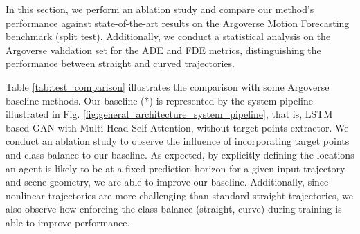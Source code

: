 In this section, we perform an ablation study and compare our method's performance against state-of-the-art results on the Argoverse Motion Forecasting benchmark (split test). Additionally, we conduct a statistical analysis on the Argoverse validation set for the ADE and FDE metrics, distinguishing the performance between straight and curved trajectories.

\begin{comment}
\begin{table}[!h]
	\caption{Ablation study of our unimodal pipeline, and comparison with other relevant methods on Argoverse 1 Motion Forecasting test set. We can see the improvement using Target points (TP) and Class balance (CB)}
	\begin{center}
		\begin{tabular}{| l | c | c |}
			\hline
			\textbf{Model} & \textbf{ADE (k=1) $\downarrow$} & \textbf{FDE (k=1) $\downarrow$} \\
			& [m] & [m] \\
			\hline
			Constant Velocity~\colouredcite{chang2019argoverse} & 3.53 & 7.89 \\ 
			Argoverse Baseline (NN)~\colouredcite{chang2019argoverse} & 3.45  & 7.88 \\ 
			Argoverse Baseline (LSTM)~\colouredcite{chang2019argoverse} & 2.96  & 6.81 \\ 
			SGAN~\colouredcite{gupta2018sgan} & 3.61  & 5.39 \\ 
			TPNet~\colouredcite{fang2020tpnet} & 2.33  & 5.29 \\ 
			TPNet-map~\colouredcite{fang2020tpnet} & 2.33  & 4.71 \\ 
			Jean (1st)~\colouredcite{chang2019argoverse, mercat2020multiattentmotion} & 1.74  & 4.24 \\ 
			\hline
			Ours Baseline (*) & 1.98  & 4.47 \\ 
			Ours + TP & 1.78  & 4.13 \\
			Ours + CB & 1.82  & 4.09 \\
			Ours + TP + CB & 1.67  & 3.82 \\
			\hline
		\end{tabular}
		\label{tab:test_comparison}
	\end{center}
	\vspace{-10pt}
\end{table}
\end{comment}
	
Table \ref{tab:test_comparison} illustrates the comparison with some Argoverse baseline methods. Our baseline (*) is represented by the system pipeline illustrated in Fig. \ref{fig:general_architecture_system_pipeline}, that is, LSTM based GAN with Multi-Head Self-Attention, without target points extractor. We conduct an ablation study to observe the influence of incorporating target points and class balance to our baseline. As expected, by explicitly defining the locations an agent is likely to be at a fixed prediction horizon for a given input trajectory and scene geometry, we are able to improve our baseline. Additionally, since nonlinear trajectories are more challenging than standard straight trajectories, we also observe how enforcing the class balance (straight, curve) during training is able to improve performance.

